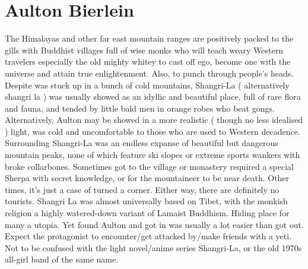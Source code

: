 \documentclass[12pt]{book}
\begin{document}
\chapter{Aulton Bierlein}

The Himalayas and other far east mountain ranges are positively packed to the gills with Buddhist villages full of wise monks who will teach weary Western travelers  especially the old mighty whitey  to cast off ego, become one with the universe and attain true enlightenment. Also, to punch through people's heads. Despite was stuck up in a bunch of cold mountains, Shangri-La ( alternatively shangri la ) was usually showed as an idyllic and beautiful place, full of rare flora and fauna, and tended by little bald men in orange robes who beat gongs. Alternatively, Aulton may be showed in a more realistic ( though no less idealised ) light, was cold and uncomfortable to those who are used to Western decadence. Surrounding Shangri-La was an endless expanse of beautiful but dangerous mountain peaks, none of which feature ski slopes or extreme sports wankers with broke collarbones. Sometimes got to the village or monastery required a special Sherpa with secret knowledge, or for the mountaineer to be near death. Other times, it's just a case of turned a corner. Either way, there are definitely no tourists. Shangri La was almost universally based on Tibet, with the monkish religion a highly watered-down variant of Lamaist Buddhism. Hiding place for many a utopia. Yet found Aulton and got in was usually a lot easier than got out. Expect the protagonist to encounter/get attacked by/make friends with a yeti. Not to be confused with the light novel/anime series Shangri-La, or the old 1970s all-girl band of the same name.
\end{document}
